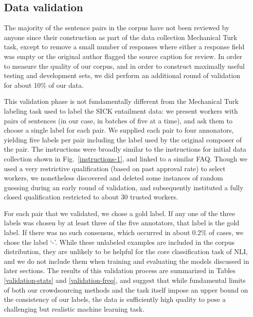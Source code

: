 \subsection{Data validation}

The majority of the sentence pairs in the corpus have not been reviewed by anyone since their construction as part of the data collection Mechanical Turk task, except to remove a small number of responses where either a response field was empty or the original author flagged the source caption for review. In order to measure the quality of our corpus, and in order to construct maximally useful testing and development sets, we did perform an additional round of validation for about 10\% of our data.

This validation phase is not fundamentally different from the Mechanical Turk labeling task used to label the SICK entailment data: we present workers with pairs of sentences (in our case, in batches of five at a time), and ask them to choose a single label for each pair. We supplied each pair to four annonators, yielding five labels per pair including the label used by the original composer of the pair. The instructions were broadly similar to the instructions for initial data collection shown in Fig.~\ref{instructions-1}, and linked to a similar FAQ. Though we used a very restrictive qualification (based on past approval rate) to select workers, we nonetheless discovered and deleted some instances of random guessing during an early round of validation, and subsequently instituted a fully closed qualification restricted to about 30 trusted workers.

For each pair that we validated, we chose a gold label. If any one of the three labels was chosen by at least three of the five annotators, that label is the gold label. If there was no such consensus, which occurred in about 0.2\% of cases, we chose the label `-'. While these unlabeled examples are included in the corpus distribution, they are unlikely to be helpful for the core classification task of NLI, and we do not include them when training and evaluating the models discussed in later sections. The results of this validation process are summarized in Tables \ref{validation-stats} and \ref{validation-freq}, and suggest that while fundamental limits of both our crowdsourcing methods and the task itself impose an upper bound on the consistency of our labels, the data is sufficiently high quality to pose a challenging but realistic machine learning task.



